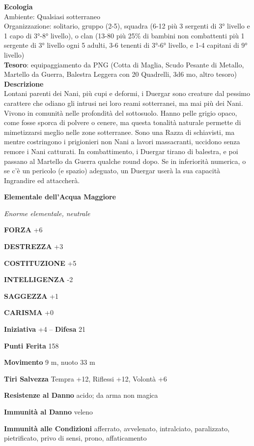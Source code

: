 \begin{multicols}{2}
\textbf{Ecologia}\\
Ambiente: Qualsiasi sotterraneo\\
Organizzazione: solitario, gruppo (2-5), squadra (6-12 più 3 sergenti di 3° livello e 1 capo di 3°-8° livello), o clan (13-80 più 25\% di bambini non combattenti più 1 sergente di 3° livello ogni 5 adulti, 3-6 tenenti di 3°-6° livello, e 1-4 capitani di 9° livello)\\
\textbf{Tesoro}: equipaggiamento da PNG (Cotta di Maglia, Scudo Pesante di Metallo, Martello da Guerra, Balestra Leggera con 20 Quadrelli, 3d6 mo, altro tesoro)\\
\textbf{Descrizione}\\
Lontani parenti dei Nani, più cupi e deformi, i Duergar sono creature dal pessimo carattere che odiano gli intrusi nei loro reami sotterranei, ma mai più dei Nani. Vivono in comunità nelle profondità del sottosuolo. Hanno pelle grigio opaco, come fosse sporca di polvere o cenere, ma questa tonalità naturale permette di mimetizzarsi meglio nelle zone sotterranee. Sono una Razza di schiavisti, ma mentre costringono i prigionieri non Nani a lavori massacranti, uccidono senza remore i Nani catturati. In combattimento, i Duergar tirano di balestra, e poi passano al Martello da Guerra qualche round dopo. Se in inferiorità numerica, o se c'è un pericolo (e spazio) adeguato, un Duergar userà la sua capacità Ingrandire ed attaccherà.

\medskip{}\textbf{Elementale dell'Acqua Maggiore}

\textit{Enorme elementale, neutrale}

\textbf{FORZA} +6

\textbf{DESTREZZA} +3

\textbf{COSTITUZIONE} +5

\textbf{INTELLIGENZA} -2

\textbf{SAGGEZZA} +1

\textbf{CARISMA} +0

\textbf{Iniziativa} +4 -- \textbf{Difesa} 21

\textbf{Punti Ferita} 158

\textbf{Movimento} 9 m, nuoto 33 m

\textbf{Tiri Salvezza} Tempra +12, Riflessi +12, Volontà +6

\textbf{Resistenze al Danno} acido; da arma non magica

\textbf{Immunità al Danno} veleno

\textbf{Immunità alle Condizioni} afferrato, avvelenato, intralciato, paralizzato, pietrificato, privo di sensi, prono, affaticamento


\end{multicols}
